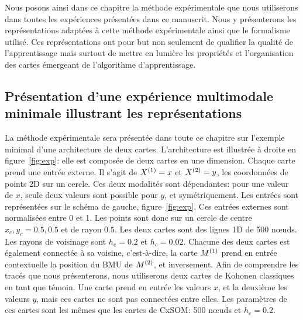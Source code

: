 Nous posons ainsi dans ce chapitre la méthode expérimentale que nous utiliserons dans toutes les expériences présentées dans ce manuscrit. Nous y présenterons les représentations adaptées à cette méthode expérimentale ainsi que le formalisme utilisé. Ces représentations ont pour but non seulement de qualifier la qualité de l'apprentissage mais surtout de mettre en lumière les propriétés et l'organisation des cartes émergeant de l'algorithme d'apprentissage. 

\subsection{Présentation d'une expérience multimodale minimale illustrant les représentations}

La méthode expérimentale sera présentée dans toute ce chapitre sur l'exemple minimal d'une architecture de deux cartes. L'architecture est illustrée à droite en figure~\ref{fig:exp}: elle est composée de deux cartes en une dimension. Chaque carte prend une entrée externe. Il s'agit de $X^{({1})}=x$ et $X^{({2})}=y$, les coordonnées de points 2D sur un cercle. Ces deux modalités sont dépendantes: pour une valeur de $x$, seule deux valeurs sont possible pour $y$, et symétriquement. Les entrées sont représentées sur le schéma de gauche, figure~\ref{fig:exp}.
Ces entrées externes sont normalisées entre 0 et 1. Les points sont donc sur un cercle de centre $x_c,y_c = 0.5,0.5$ et de rayon $0.5$.
Les deux cartes sont des lignes 1D de 500 n\oe{}uds. Les rayons de voisinage sont $h_e = 0.2$ et $h_c = 0.02$.
Chacune des deux cartes est également connectée à sa voisine, c'est-à-dire, la carte $M^{({1})}$ prend en entrée contextuelle la position du BMU de $M^{({2})}$, et inversement.
Afin de comprendre les tracés que nous présenterons, nous utiliserons deux cartes de Kohonen classiques en tant que témoin.
Une carte prend en entrée les valeurs $x$, et la deuxième les valeurs $y$, mais ces cartes ne sont pas connectées entre elles. Les paramètres de ces cartes sont les mêmes que les cartes de CxSOM: 500 n\oe{}uds et $h_e = 0.2$.

